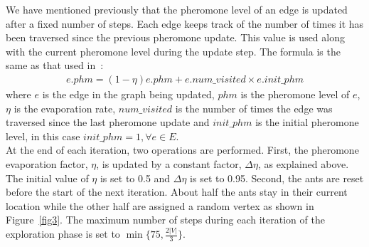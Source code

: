 \begin{spacing}{1.5}
\indent We have mentioned previously that the pheromone level of an edge is updated after a fixed number of steps. Each edge keeps track of the number of times it has been traversed since the previous pheromone update. This value is used along with the current pheromone level during the update step. The formula is the same as that used in~\cite{5910378}:
\begin{align}
e.phm = (1 - \eta)e.phm + e.num\_visited \times e.init\_phm
\end{align}
where $e$ is the edge in the graph being updated, $phm$ is the pheromone level of $e$, $\eta$ is the evaporation rate, $num\_visited$ is the number of times the edge was traversed since the last pheromone update and $init\_phm$ is the initial pheromone level, in this case $init\_phm = 1, \forall e \in E$.\\
\indent At the end of each iteration, two operations are performed. First, the pheromone evaporation factor, $\eta$, is updated by a constant factor, $\Delta\eta$, as explained above. The initial value of $\eta$ is set to 0.5 and $\Delta\eta$ is set to 0.95. Second, the ants are reset before the start of the next iteration. About half the ants stay in their current location while the other half are assigned a random vertex as shown in Figure~\ref{fig3}. The maximum number of steps during each iteration of the exploration phase is set to $\min\{75, \frac{2|V|}{3}\}$.


\end{spacing}
